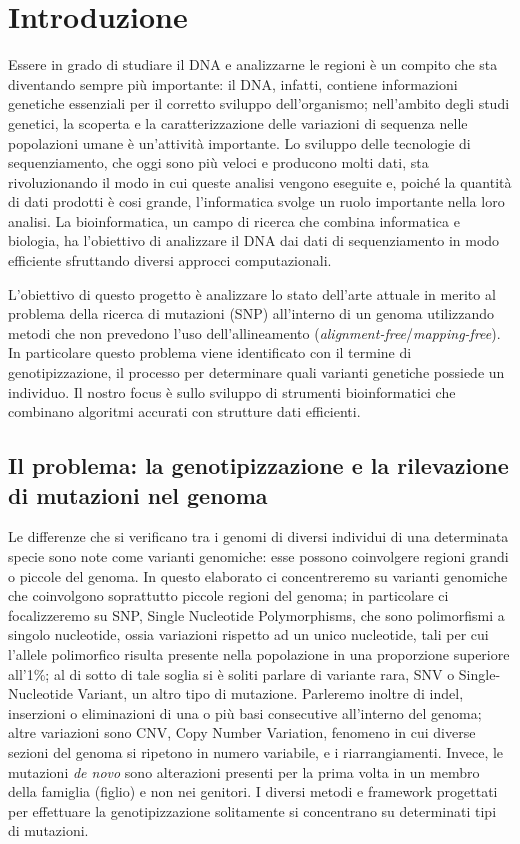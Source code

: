 \documentclass[../main.tex]{subfiles}
\begin{document}
\section{Introduzione} 

Essere in grado di studiare il DNA e analizzarne le regioni è un compito che sta diventando sempre più importante: il DNA, infatti, contiene informazioni genetiche essenziali per il corretto sviluppo dell'organismo; nell'ambito degli studi genetici, la scoperta e la caratterizzazione delle variazioni di sequenza nelle popolazioni umane è un'attività importante. Lo sviluppo delle tecnologie di sequenziamento, che oggi sono più veloci e producono molti dati, sta rivoluzionando il modo in cui queste analisi vengono eseguite e, poiché la quantità di dati prodotti è cosi grande, l'informatica svolge un ruolo importante nella loro analisi. La bioinformatica, un campo di ricerca che combina informatica e biologia, ha l'obiettivo di analizzare il DNA dai dati di sequenziamento in modo efficiente sfruttando diversi approcci computazionali.

L'obiettivo di questo progetto è analizzare lo stato dell'arte attuale in merito al problema della ricerca di mutazioni (SNP) all'interno di un genoma utilizzando metodi che non prevedono l'uso dell'allineamento (\textit{alignment-free}/\textit{mapping-free}). In particolare questo problema viene identificato con il termine di genotipizzazione, il processo per determinare quali varianti genetiche possiede un individuo. Il nostro focus è sullo sviluppo di strumenti bioinformatici che combinano algoritmi accurati con strutture dati efficienti. 

\subsection{Il problema: la genotipizzazione e la rilevazione di mutazioni nel genoma}

\noindent
Le differenze che si verificano tra i genomi di diversi individui di una determinata specie sono note come varianti genomiche: esse possono coinvolgere regioni grandi o piccole del genoma. 
In questo elaborato ci concentreremo su varianti genomiche che coinvolgono soprattutto piccole regioni del genoma; in particolare ci focalizzeremo su SNP, Single Nucleotide Polymorphisms, che sono polimorfismi a singolo nucleotide, ossia variazioni rispetto ad un unico nucleotide, tali per cui l'allele polimorfico risulta presente nella popolazione in una proporzione superiore all'1\%; al di sotto di tale soglia si è soliti parlare di variante rara, SNV o Single-Nucleotide Variant, un altro tipo di mutazione. Parleremo inoltre di indel, inserzioni o eliminazioni di una o più basi consecutive all'interno del genoma; altre variazioni sono CNV, Copy Number Variation, fenomeno in cui diverse sezioni del genoma si ripetono in numero variabile, e i riarrangiamenti. Invece, le mutazioni \textit{de novo} sono alterazioni presenti per la prima volta in un membro della famiglia (figlio) e non nei genitori. I diversi metodi e framework progettati per effettuare la genotipizzazione solitamente si concentrano su determinati tipi di mutazioni.
\end{document}
